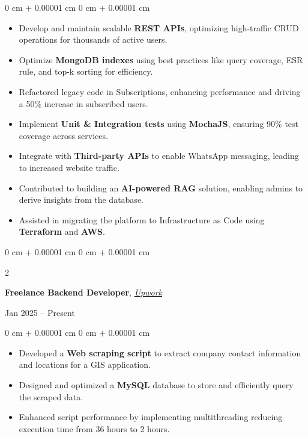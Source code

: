 \documentclass[10pt, letterpaper]{article}
\newenvironment{highlights}{
    \begin{itemize}[
        topsep=0.10 cm,
        parsep=0.10 cm,
        partopsep=0pt,
        itemsep=1pt,
        leftmargin=0 cm + 12pt
    ]
}{
    \end{itemize}
} %
\newenvironment{onecolentry}{
    \begin{adjustwidth}{
        0 cm + 0.00001 cm
    }{
        0 cm + 0.00001 cm
    }
}{
    \end{adjustwidth}
} %
\newenvironment{twocolentry}[2][]{
    \onecolentry
    \def\secondColumn{#2}
    \setcolumnwidth{\fill, 4.5 cm}
    \begin{paracol}{2}
}{
    \switchcolumn \raggedleft \secondColumn
    \end{paracol}
    \endonecolentry
} %
\begin{document}
        \begin{onecolentry}
            \begin{highlights}
                \item Develop and maintain scalable \textbf{REST APIs}, optimizing high-traffic CRUD operations for thousands of active users.  
                \item Optimize \textbf{MongoDB indexes} using best practices like query coverage, ESR rule, and top-k sorting for efficiency.  
                \item Refactored legacy code in Subscriptions, enhancing performance and driving a 50\% increase in subscribed users.  
                \item Implement \textbf{Unit \& Integration tests} using \textbf{MochaJS}, ensuring 90\% test coverage across services.  
                \item Integrate with \textbf{Third-party APIs} to enable WhatsApp messaging, leading to increased website traffic.
                \item Contributed to building an \textbf{AI-powered RAG} solution, enabling admins to derive insights from the database.  
                \item Assisted in migrating the platform to Infrastructure as Code using \textbf{Terraform} and \textbf{AWS}.  
                
            \end{highlights}
        \end{onecolentry}

        \vspace{0.1 cm}

        \begin{twocolentry}{ Jan 2025 – Present}
            \textbf{Freelance Backend Developer}, \href{https://www.upwork.com/freelancers/~01692416cd8597ae37?mp_source=share}{\textit{Upwork}} 
        \end{twocolentry}
        \vspace{0.1 cm}

        \begin{onecolentry}
            \begin{highlights}
                \item Developed a \textbf{Web scraping script} to extract company contact information and locations for a GIS application.
                \item Designed and optimized a \textbf{MySQL} database to store and efficiently query the scraped data.
                \item Enhanced script performance by implementing multithreading reducing execution time from 36 hours to 2 hours.
                
            \end{highlights}
        \end{onecolentry}
\end{document}
